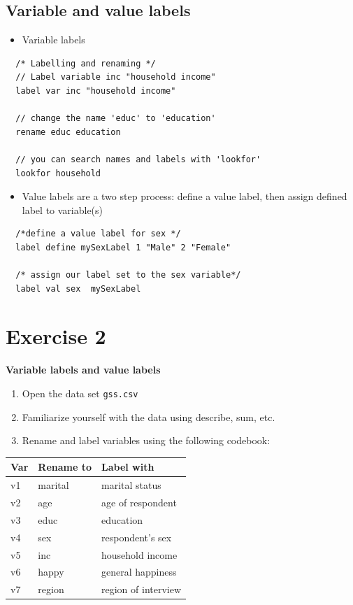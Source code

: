 \documentclass[]{book}
\providecommand{\tightlist}{%
  \setlength{\itemsep}{0pt}\setlength{\parskip}{0pt}}
\begin{document}
\subsection{Variable and value labels}\label{variable-and-value-labels}

\begin{itemize}
\tightlist
\item
  Variable labels
\end{itemize}

\begin{verbatim}
  /* Labelling and renaming */
  // Label variable inc "household income"
  label var inc "household income"

  // change the name 'educ' to 'education'
  rename educ education

  // you can search names and labels with 'lookfor' 
  lookfor household
\end{verbatim}

\begin{itemize}
\tightlist
\item
  Value labels are a two step process: define a value label, then assign
  defined label to variable(s)
\end{itemize}

\begin{verbatim}
  /*define a value label for sex */
  label define mySexLabel 1 "Male" 2 "Female"

  /* assign our label set to the sex variable*/
  label val sex  mySexLabel
\end{verbatim}

\section{Exercise 2}\label{exercise-2-3}

\textbf{Variable labels and value labels}

\begin{enumerate}
\def\labelenumi{\arabic{enumi}.}
\tightlist
\item
  Open the data set \texttt{gss.csv}
\item
  Familiarize yourself with the data using describe, sum, etc.
\item
  Rename and label variables using the following codebook:
\end{enumerate}

\begin{longtable}[]{@{}lll@{}}
\toprule
Var & Rename to & Label with\tabularnewline
\midrule
\endhead
v1 & marital & marital status\tabularnewline
v2 & age & age of respondent\tabularnewline
v3 & educ & education\tabularnewline
v4 & sex & respondent's sex\tabularnewline
v5 & inc & household income\tabularnewline
v6 & happy & general happiness\tabularnewline
v7 & region & region of interview\tabularnewline
\bottomrule
\end{longtable}
\end{document}
